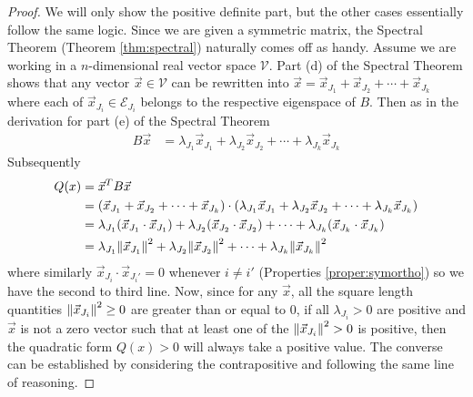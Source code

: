 \begin{proof}
We will only show the positive definite part, but the other cases essentially follow the same logic. Since we are given a symmetric matrix, the Spectral Theorem (Theorem \ref{thm:spectral}) naturally comes off as handy. Assume we are working in a $n$-dimensional real vector space $\mathcal{V}$. Part (d) of the Spectral Theorem shows that any vector $\vec{x} \in \mathcal{V}$ can be rewritten into $\vec{x} = \vec{x}_{J_1} + \vec{x}_{J_2} + \cdots + \vec{x}_{J_k}$ where each of $\vec{x}_{J_i} \in \mathcal{E}_{J_i}$ belongs to the respective eigenspace of $B$. Then as in the derivation for part (e) of the Spectral Theorem
\begin{align*}
B\vec{x} &= \lambda_{J_1}\vec{x}_{J_1} + \lambda_{J_2}\vec{x}_{J_2} + \cdots + \lambda_{J_k}\vec{x}_{J_k}
\end{align*}
Subsequently
\begin{align*}
Q(x) &= \vec{x}^T B\vec{x} \\
&= (\vec{x}_{J_1} + \vec{x}_{J_2} + \cdots + \vec{x}_{J_k}) \cdot (\lambda_{J_1}\vec{x}_{J_1} + \lambda_{J_2}\vec{x}_{J_2} + \cdots + \lambda_{J_k}\vec{x}_{J_k}) \\
&= \lambda_{J_1}(\vec{x}_{J_1} \cdot \vec{x}_{J_1}) + \lambda_{J_2}(\vec{x}_{J_2} \cdot \vec{x}_{J_2}) + \cdots + \lambda_{J_k}(\vec{x}_{J_k} \cdot \vec{x}_{J_k}) \\
&= \lambda_{J_1}\norm{\vec{x}_{J_1}}^2 + \lambda_{J_2}\norm{\vec{x}_{J_2}}^2 + \cdots + \lambda_{J_k}\norm{\vec{x}_{J_k}}^2
\end{align*}
where similarly $\vec{x}_{J_i} \cdot \vec{x}_{J_i'} = 0$ whenever $i \neq i'$ (Properties \ref{proper:symortho}) so we have the second to third line. Now, since for any $\vec{x}$, all the square length quantities $\norm{\vec{x}_{J_i}}^2 \geq 0$ are greater than or equal to $0$, if all $\lambda_{J_i} > 0$ are positive and $\vec{x}$ is not a zero vector such that at least one of the $\norm{\vec{x}_{J_i}}^2 > 0$ is positive, then the quadratic form $Q(x) > 0$ will always take a positive value. The converse can be established by considering the contrapositive and following the same line of reasoning.
\end{proof}


